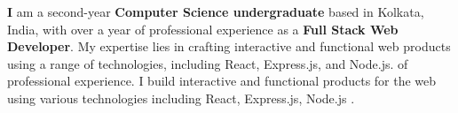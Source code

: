 
\textbf I am a second-year \textbf{Computer Science undergraduate} based in Kolkata, India, with over a year of professional experience as a \textbf{Full Stack Web Developer}. My expertise lies in crafting interactive and functional web products using a range of technologies, including React, Express.js, and Node.js. of professional experience. I build interactive and functional products for the web using various technologies including React, Express.js, Node.js .